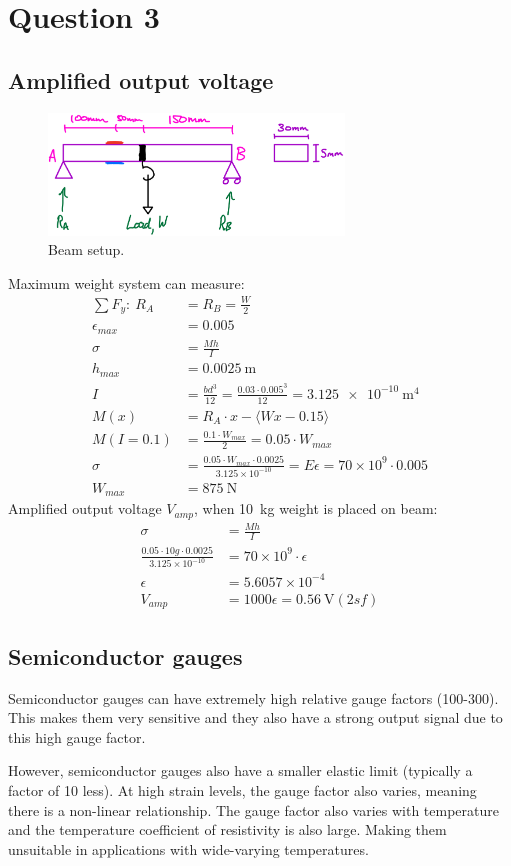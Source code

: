 \documentclass[12pt]{article}
\numberwithin{equation}{section}
\begin{document}
\section{Question 3}
\subsection*{Amplified output voltage}
\begin{figure}[H]
  \centering
  \includegraphics[width=0.7\textwidth]{./img/6-1diagram.png}
  \caption{Beam setup.}
\end{figure}
Maximum weight system can measure:
\begin{align}
  \sum F_y: \ R_A &= R_B = \frac{W}{2}\\
  \epsilon_{max} &= 0.005\\
  \sigma &= \frac{Mh}{I}\\
  h_{max} &= \SI{0.0025}{\metre}\\
  I &= \frac{bd^3}{12} = \frac{0.03 \cdot 0.005^3}{12} = \SI{3.125e-10}{\metre\tothe{4}}\\
  M(x) &= R_A \cdot x - \langle Wx-0.15\rangle\\
  M(I=0.1) &= \frac{0.1 \cdot W_{max}}{2} = 0.05\cdot W_{max}\\
  \sigma &= \frac{0.05\cdot W_{max} \cdot 0.0025}{3.125 \times 10^{-10}} = E\epsilon = 70 \times 10^{9} \cdot 0.005\\
  W_{max} &= \SI{875}{\newton}
\end{align}
Amplified output voltage $V_{amp}$, when \SI{10}{\kilo\gram} weight is placed on beam:
\begin{align}
  \sigma &= \frac{Mh}{I}\\
  \frac{0.05\cdot 10g \cdot 0.0025}{3.125\times 10^{-10}} &= 70 \times 10^{9} \cdot \epsilon\\
  \epsilon &= 5.6057 \times 10^{-4}\\
  V_{amp} &= 1000\epsilon = \SI{0.56}{\volt} (2sf)
\end{align}
\subsection*{Semiconductor gauges}
Semiconductor gauges can have extremely high relative gauge factors (100-300). This makes them very sensitive and they also have a strong output signal due to this high gauge factor.

However, semiconductor gauges also have a smaller elastic limit (typically a factor of 10 less). At high strain levels, the gauge factor also varies, meaning there is a non-linear relationship. The gauge factor also varies with temperature and the temperature coefficient of resistivity is also large. Making them unsuitable in applications with wide-varying temperatures.
\end{document}
